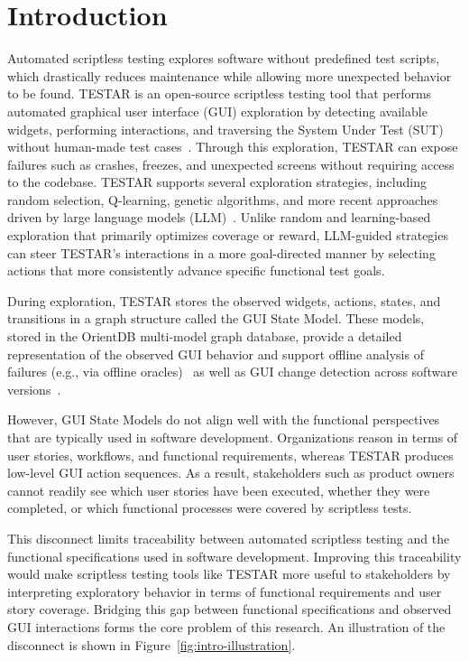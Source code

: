 \documentclass{ou-report-vaf}
\begin{document}
\section{Introduction}
\label{sec:introduction}

Automated scriptless testing explores software without predefined test scripts, which drastically reduces maintenance while allowing more unexpected behavior to be found. TESTAR is an open-source scriptless testing tool that performs automated graphical user interface (GUI) exploration by detecting available widgets, performing interactions, and traversing the System Under Test (SUT) without human-made test cases~\citep{vos2021testar}. Through this exploration, TESTAR can expose failures such as crashes, freezes, and unexpected screens without requiring access to the codebase. TESTAR supports several exploration strategies, including random selection, Q-learning, genetic algorithms, and more recent approaches driven by large language models (LLM)~\citep{esparcia2016q,esparcia2018using,van2025llm}. Unlike random and learning-based exploration that primarily optimizes coverage or reward, LLM-guided strategies can steer TESTAR’s interactions in a more goal-directed manner by selecting actions that more consistently advance specific functional test goals.

During exploration, TESTAR stores the observed widgets, actions, states, and transitions in a graph structure called the GUI State Model. These models, stored in the OrientDB multi-model graph database, provide a detailed representation of the observed GUI behavior and support offline analysis of failures (e.g., via offline oracles)~\citep{de2019offline} as well as GUI change detection across software versions~\citep{ricos2025delta}.

However, GUI State Models do not align well with the functional perspectives that are typically used in software development. Organizations reason in terms of user stories, workflows, and functional requirements, whereas TESTAR produces low-level GUI action sequences. As a result, stakeholders such as product owners cannot readily see which user stories have been executed, whether they were completed, or which functional processes were covered by scriptless tests.

This disconnect limits traceability between automated scriptless testing and the functional specifications used in software development. Improving this traceability would make scriptless testing tools like TESTAR more useful to stakeholders by interpreting exploratory behavior in terms of functional requirements and user story coverage. Bridging this gap between functional specifications and observed GUI interactions forms the core problem of this research. An illustration of the disconnect is shown in Figure~\ref{fig:intro-illustration}.
\end{document}
